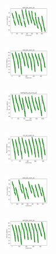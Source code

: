 \begin{figure}[H]
\begin{subfigure}
        \centering
        \includegraphics[width=0.234\textwidth]{img/bmb/ecoli_set_const_10_589741062_cost.png}
    \end{subfigure}
    \hfill
    \begin{subfigure}
        \centering
        \includegraphics[width=0.234\textwidth]{img/bmb/rand_set_const_10_589741062_cost.png}
    \end{subfigure}
    \hfill
    \begin{subfigure}
        \centering
        \includegraphics[width=0.234\textwidth]{img/bmb/newthyroid_set_const_10_589741062_cost.png}
    \end{subfigure}
    \hfill
    \begin{subfigure}
        \centering
        \includegraphics[width=0.234\textwidth]{img/bmb/iris_set_const_10_277451237_cost.png}
    \end{subfigure}
    \hfill
    \begin{subfigure}
        \centering
        \includegraphics[width=0.234\textwidth]{img/bmb/ecoli_set_const_10_277451237_cost.png}
    \end{subfigure}
    \hfill
    \begin{subfigure}
        \centering
        \includegraphics[width=0.234\textwidth]{img/bmb/rand_set_const_10_277451237_cost.png}

\end{subfigure}
\end{figure}
